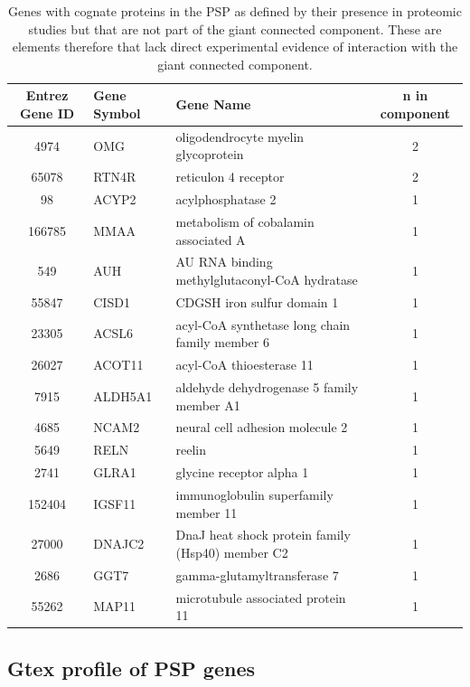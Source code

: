 \begin{table}[ht]
\centering
\begin{tabular}{cllc}
\toprule
 
Entrez Gene ID & Gene Symbol & Gene Name & n in component \\ 
\midrule
 4974 & OMG & oligodendrocyte myelin glycoprotein & 2 \\ 
  65078 & RTN4R & reticulon 4 receptor & 2 \\ 
 98 & ACYP2 & acylphosphatase 2 & 1 \\ 
  166785 & MMAA & metabolism of cobalamin associated A & 1 \\ 
  549 & AUH & AU RNA binding methylglutaconyl-CoA hydratase & 1 \\ 
  55847 & CISD1 & CDGSH iron sulfur domain 1 & 1 \\ 
  23305 & ACSL6 & acyl-CoA synthetase long chain family member 6 & 1 \\ 
  26027 & ACOT11 & acyl-CoA thioesterase 11 & 1 \\ 
  7915 & ALDH5A1 & aldehyde dehydrogenase 5 family member A1 & 1 \\ 
  4685 & NCAM2 & neural cell adhesion molecule 2 & 1 \\ 
 
  5649 & RELN & reelin & 1 \\ 
  2741 & GLRA1 & glycine receptor alpha 1 & 1 \\ 
  152404 & IGSF11 & immunoglobulin superfamily member 11 & 1 \\ 
 
  27000 & DNAJC2 & DnaJ heat shock protein family (Hsp40) member C2 & 1 \\ 
  2686 & GGT7 & gamma-glutamyltransferase 7 & 1 \\ 
  55262 & MAP11 & microtubule associated protein 11 & 1 \\ 
   \bottomrule
\end{tabular}
\caption{Genes with cognate proteins in the PSP as defined by their presence in proteomic studies but that are not part of the giant connected component. These are elements therefore that lack direct experimental evidence of interaction with the giant connected component. } 
\label{table:notinLCC}
\end{table}


\subsection{Gtex profile of PSP genes}
\label{gtex profile of PSP genes}
